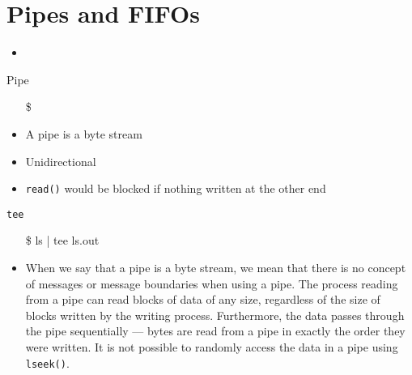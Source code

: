 \section{Pipes and FIFOs}
\label{sec:pipes-fifos}

\begin{itemize}
\item {}
\end{itemize}

\begin{frame}{Pipe}
  \begin{itemize}
  \item[\$] 
  \end{itemize}
  \begin{center}
  \end{center}
  \begin{itemize}
  \item A pipe is a byte stream
  \item Unidirectional
  \item \texttt{read()} would be blocked if nothing written at the other end
  \end{itemize}
  \ttfamily
  \begin{iblock}{\texttt{tee}}
    \begin{center}
      \begin{minipage}{.35\linewidth}
        \begin{itemize}
        \item[\$] ls | tee ls.out
        \end{itemize}
      \end{minipage}\quad
      \begin{minipage}{.55\linewidth}
      \end{minipage}
    \end{center}
  \end{iblock}
\end{frame}

\begin{itemize}
\item When we say that a pipe is a byte stream, we mean that there is no concept of
  messages or message boundaries when using a pipe. The process reading from a pipe can
  read blocks of data of any size, regardless of the size of blocks written by the writing
  process. Furthermore, the data passes through the pipe sequentially --- bytes are read from
  a pipe in exactly the order they were written. It is not possible to randomly access the
  data in a pipe using \texttt{lseek()}. 
\end{itemize}


